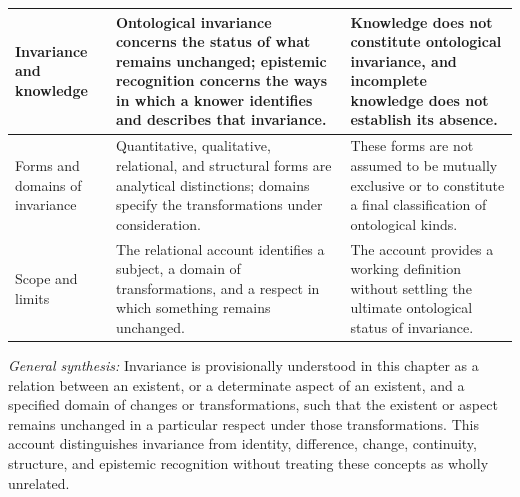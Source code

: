 \begin{table}[htbp]
\begin{tabular}{|p{}|p{}|p{}|}
        Invariance and knowledge &
        Ontological invariance concerns the status of what remains unchanged; epistemic recognition concerns the ways in which a knower identifies and describes that invariance. &
        Knowledge does not constitute ontological invariance, and incomplete knowledge does not establish its absence. \\
        \hline

        Forms and domains of invariance &
        Quantitative, qualitative, relational, and structural forms are analytical distinctions; domains specify the transformations under consideration. &
        These forms are not assumed to be mutually exclusive or to constitute a final classification of ontological kinds. \\
        \hline

        Scope and limits &
        The relational account identifies a subject, a domain of transformations, and a respect in which something remains unchanged. &
        The account provides a working definition without settling the ultimate ontological status of invariance. \\
        \hline

    \end{tabular}
\end{table}

\vspace{0.5em}

\noindent
\textit{General synthesis:}
Invariance is provisionally understood in this chapter as a relation between an existent, or a determinate aspect of an existent, and a specified domain of changes or transformations, such that the existent or aspect remains unchanged in a particular respect under those transformations. This account distinguishes invariance from identity, difference, change, continuity, structure, and epistemic recognition without treating these concepts as wholly unrelated.

